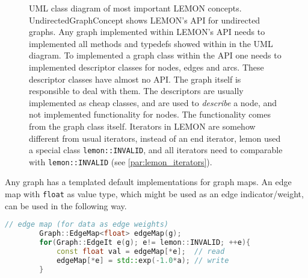 \begin{figure}[H]
\begin{center}
    \end{center}
    \caption{
        UML class diagram of most important LEMON concepts.
        UndirectedGraphConcept shows LEMON's API for undirected 
        graphs. Any graph implemented within LEMON's API 
        needs to implemented all methods and typedefs showed 
        within in the UML diagram.
        To implemented a graph class within the API one needs 
        to implemented descriptor classes for nodes, edges and arcs.
        These descriptor classes have almost no API.
        The graph itself is responsible to deal with them.
        The descriptors are usually implemented as cheap classes,
        and are used to \emph{describe} a node, and not implemented
        functionality for nodes.
        The functionality comes from the graph class itself.
        Iterators in LEMON are somehow different from usual 
        iterators, instead of an end iterator, lemon used a special
        class \lstinline{lemon::INVALID}, and all iterators
        need to comparable with \lstinline{lemon::INVALID} (see \cref{par:lemon_iterators}).
    }\label{fig:uml_lemon_graph_concepts}
    \end{figure}






        Any graph has a templated default implementations for graph maps.
        An edge map with \lstinline{float} as value type, which might
        be used as an edge indicator/weight, can be 
        used in the following way.

        \begin{lstlisting}[language=c++]
        // edge map (for data as edge weights)
        Graph::EdgeMap<float> edgeMap(g); 
        for(Graph::EdgeIt e(g); e!= lemon::INVALID; ++e){
            const float val = edgeMap[*e];  // read
            edgeMap[*e] = std::exp(-1.0*a); // write
        }
        \end{lstlisting}

